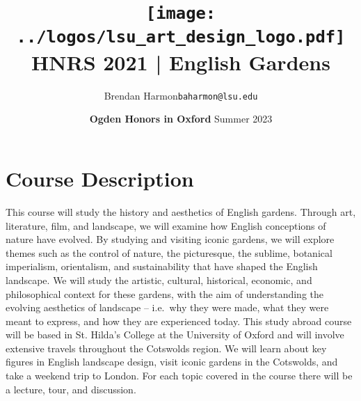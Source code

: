 \documentclass[11pt,article,oneside]{memoir}
\makeatletter
\def\myauthor{Author}
\def\mytitle{Title}
\def\myemail{baharmon@lsu.edu}
\def\myauthor{Brendan Harmon}
\def\mytitle{ \texttt{[image: ../logos/lsu\_art\_design\_logo.pdf]} \\[0.1cm] {\normalfont \normalsize HNRS 2021 |} \Large English Gardens}
\newcommand{\globalcolor}[1]{%
  \color{#1}\global\let\default@color\current@color
}
\makeatother
\begin{document}
\setlength\bibitemsep{0.5em}

\setmainfont[Scale=1, Path = ../fonts/lato/,BoldItalicFont=Lato-BolIta,BoldFont=Lato-Bol,ItalicFont=Lato-RegIta]{Lato-Reg}
\setmonofont[Mapping=tex-text,Scale=0.8,Path = ../fonts/inconsolata/]{i}

\def\ind{\hangindent=1 true cm\hangafter=1 \noindent}
\def\labelitemi{$\cdot$}

\title{\LARGE \mytitle}
\author{\Large\myauthor \newline \footnotesize\texttt{\noindent\myemail}}
\date{\textbf{Ogden Honors in Oxford} \newline Summer 2023}
\published{\,}





\globalcolor{black}
\vspace*{-10em}
\maketitle

\section{Course Description}

This course will study the history and aesthetics of English gardens. Through art, literature, film, and landscape, we will examine how English conceptions of nature have evolved. By studying and visiting iconic gardens, we will explore themes such as the control of nature, the picturesque, the sublime, botanical imperialism, orientalism, and sustainability that have shaped the English landscape. We will study the artistic, cultural, historical, economic, and philosophical context for these gardens, with the aim of understanding the evolving aesthetics of landscape -- i.e.~why they were made, what they were meant to express, and how they are experienced today. This study abroad course  will be based in St. Hilda's College at the University of Oxford and will involve extensive travels throughout the Cotswolds region. We will learn about key figures in English landscape design, visit iconic gardens in the Cotswolds, and take a weekend trip to London.  For each topic covered in the course there will be a lecture, tour, and discussion. 
\end{document}
